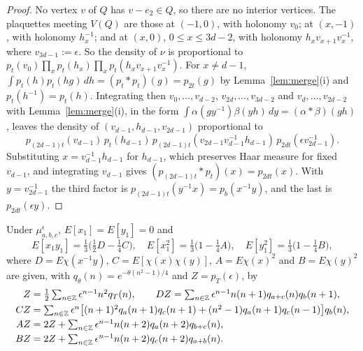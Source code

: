 \begin{proof}
No vertex $v$ of $Q$ has $v-e_2\in Q$, so there are no interior vertices. The
plaquettes meeting $V(Q)$ are those at $(-1,0)$, with holonomy $v_0$; at
$(x,-1)$, with holonomy $h_x^{-1}$; and at $(x,0)$, $0\le x\le3d-2$, with
holonomy $h_xv_{x+1}v_x^{-1}$, where $v_{3d-1}:=\epsilon$. So the density of
$\nu$ is proportional to $p_t(v_0)\prod_xp_t(h_x)\prod_xp_t(h_xv_{x+1}v_x^{-1})$.
For $x\ne d-1$, $\int p_t(h)p_t(hg)\,dh=(p_t*p_t)(g)=p_{2t}(g)$ by
Lemma~\ref{lem:merge}(i) and $p_t(h^{-1})=p_t(h)$. Integrating then
$v_0,\dots,v_{d-2}$, $v_{2d},\dots,v_{3d-2}$ and $v_d,\dots,v_{2d-2}$ with
Lemma~\ref{lem:merge}(i), in the form $\int\alpha(gy^{-1})\beta(yh)\,dy=(\alpha*
\beta)(gh)$, leaves the density of $(v_{d-1},h_{d-1},v_{2d-1})$ proportional to
\[
p_{(2d-1)t}(v_{d-1})\,p_t(h_{d-1})\,p_{(2d-1)t}(v_{2d-1}v_{d-1}^{-1}h_{d-1})\,
p_{2dt}(\epsilon v_{2d-1}^{-1}).
\]
Substituting $x=v_{d-1}^{-1}h_{d-1}$ for $h_{d-1}$, which preserves Haar measure
for fixed $v_{d-1}$, and integrating $v_{d-1}$ gives $(p_{(2d-1)t}*p_t)(x)=
p_{2dt}(x)$. With $y=v_{2d-1}^{-1}$ the third factor is $p_{(2d-1)t}(y^{-1}x)=
p_b(x^{-1}y)$, and the last is $p_{2dt}(\epsilon y)$.
\end{proof}

\begin{lemma}\label{lem:moments}
Under $\mu^\epsilon_{a,b,c}$, $E[x_1]=E[y_1]=0$ and
\[
E[x_1y_1]=\tfrac13\bigl(\tfrac12D-\tfrac14C\bigr),\quad E[x_1^2]=\tfrac13
\bigl(1-\tfrac14A\bigr),\quad E[y_1^2]=\tfrac13\bigl(1-\tfrac14B\bigr),
\]
where $D=E\chi(x^{-1}y)$, $C=E[\chi(x)\chi(y)]$, $A=E\chi(x)^2$ and $B=E\chi(
y)^2$ are given, with $q_\theta(n)=e^{-\theta(n^2-1)/4}$ and $Z=p_T(\epsilon)$, by
\begin{align*}
Z&=\tfrac12\textstyle\sum_{n\in\mathbb{Z}}\epsilon^{n-1}n^2q_T(n),\qquad
DZ=\sum_{n\in\mathbb{Z}}\epsilon^{n-1}n(n+1)q_{a+c}(n)q_b(n+1),\\
CZ&=\textstyle\sum_{n\in\mathbb{Z}}\epsilon^n\bigl[(n+1)^2q_a(n+1)q_c(n+1)+(n^2-1)
q_a(n+1)q_c(n-1)\bigr]q_b(n),\\
AZ&=2Z+\textstyle\sum_{n\in\mathbb{Z}}\epsilon^{n-1}n(n+2)q_a(n+2)q_{b+c}(n),\\
BZ&=2Z+\textstyle\sum_{n\in\mathbb{Z}}\epsilon^{n-1}n(n+2)q_c(n+2)q_{a+b}(n).
\end{align*}
\end{lemma}

